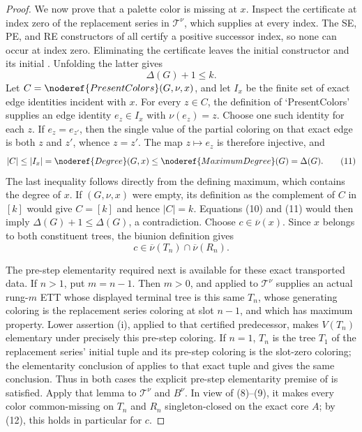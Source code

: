 \begin{proof}
We now prove that a palette color is missing at $x$.  Inspect the
certificate at index zero of the replacement series in $\mathcal T^\nu$,
which  supplies at every index.  The SE, PE, and
RE constructors of  all certify a positive
successor index, so none can occur at index zero.  Eliminating the
certificate leaves the initial constructor and its initial
.  Unfolding the latter gives
\[
                              \Delta(G)+1\leq k.                \tag{10}
\]
Let $C=\noderef{PresentColors}(G,\nu,x)$, and let $I_x$ be the finite set
of exact edge identities incident with $x$.  For every $z\in C$, the
definition of `PresentColors' supplies an edge identity $e_z\in I_x$ with
$\nu(e_z)=z$.  Choose one such identity for each $z$.  If
$e_z=e_{z'}$, then the single value of the partial coloring on that exact
edge is both $z$ and $z'$, whence $z=z'$.  The map $z\mapsto e_z$ is
therefore injective, and
\[
 |C|\leq |I_x|=\noderef{Degree}(G,x)
          \leq\noderef{MaximumDegree}(G)=\Delta(G).            \tag{11}
\]
The last inequality follows directly from the defining maximum, which
contains the degree of $x$.  If
$(G,\nu,x)$ were empty, its definition as the
complement of $C$ in $[k]$ would give $C=[k]$ and hence $|C|=k$.
Equations (10) and (11) would then imply
$\Delta(G)+1\leq\Delta(G)$, a contradiction.  Choose
$c\in\overline\nu(x)$.  Since $x$ belongs to both constituent trees, the
biunion definition  gives
\[
                 c\in\overline\nu(T_n)\cap\overline\nu(R_n).  \tag{12}
\]

The pre-step elementarity required next is available for these exact
transported data.  If $n>1$, put $m=n-1$.  Then $m>0$, and
 applied to $\mathcal T^\nu$ supplies an
actual rung-$m$ ETT whose displayed terminal tree is this same $T_n$, whose
generating coloring is the replacement series coloring at slot $n-1$, and
which has maximum property.  Lower assertion (i), applied to that certified
predecessor, makes $V(T_n)$ elementary under precisely this pre-step
coloring.  If $n=1$, $T_n$ is the tree $T_1$ of the replacement series'
initial tuple and its pre-step coloring is the slot-zero coloring;
the elementarity conclusion of  applies to
that exact tuple and gives the same conclusion.  Thus in both cases the
explicit pre-step elementarity premise of
 is satisfied.  Apply that lemma to
$\mathcal T^\nu$ and $B^\nu$.  In view of (8)--(9), it makes every color
common-missing on $T_n$ and $R_n$ singleton-closed on the exact core $A$;
by (12), this holds in particular for $c$.


\end{proof}
